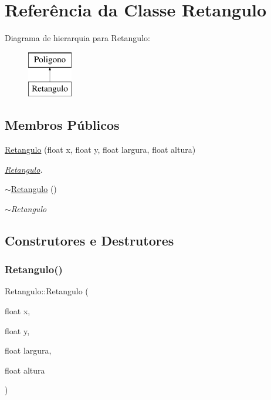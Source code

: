 \hypertarget{class_retangulo}{}\section{Referência da Classe Retangulo}
\label{class_retangulo}
Diagrama de hierarquia para Retangulo\+:\begin{figure}[H]
\begin{center}
\leavevmode
\includegraphics[height=2.000000cm]{class_retangulo}
\end{center}
\end{figure}
\subsection*{Membros Públicos}
\begin{DoxyCompactItemize}
\item 
\mbox{\hyperlink{class_retangulo_acca1dd211eefc8dc04658c943c0d1122}{Retangulo}} (float x, float y, float largura, float altura)
\begin{DoxyCompactList}\small\item\em \mbox{\hyperlink{class_retangulo}{Retangulo}}. \end{DoxyCompactList}\item 
\mbox{\label{class_retangulo_a52b1a7f23e13a531a30526825b164615}} 
\mbox{\hyperlink{class_retangulo_a52b1a7f23e13a531a30526825b164615}{$\sim$\+Retangulo}} ()
\begin{DoxyCompactList}\small\item\em $\sim$\+Retangulo \end{DoxyCompactList}\end{DoxyCompactItemize}


\subsection{Construtores e Destrutores}
\mbox{\label{class_retangulo_acca1dd211eefc8dc04658c943c0d1122}} 
\subsubsection{\texorpdfstring{Retangulo()}{Retangulo()}}
{\footnotesize\ttfamily Retangulo\+::\+Retangulo (\begin{DoxyParamCaption}\item[{float}]{x,  }\item[{float}]{y,  }\item[{float}]{largura,  }\item[{float}]{altura }\end{DoxyParamCaption})}



